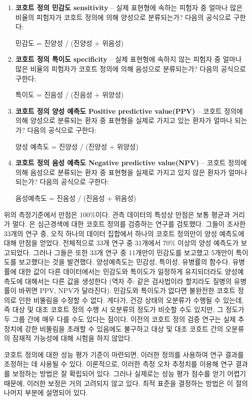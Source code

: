 \documentclass[10.5pt]{book}
\theoremstyle{definition}
\theoremstyle{definition}
\theoremstyle{definition}
\theoremstyle{remark}
\begin{document}
\begin{enumerate}
\def\labelenumi{\arabic{enumi}.}
\item
  \textbf{코호트 정의 민감도 sensitivity} -- 실제 표현형에 속하는 피험자
  중 얼마나 많은 비율의 피험자가 코호트 정의에 의해 양성으로 분류되는가?
  다음의 공식으로 구한다:

  민감도 = 진양성 / (진양성 + 위음성)
\item
  \textbf{코호트 정의 특이도 specificity} -- 실제 표현형에 속하지 않는
  피험자 중 얼마나 많은 비율의 피험자가 코호트 정의에 의해 음성으로
  분류되는가? 다음의 공식으로 구한다:

  특이도 = 진음성 / (진음성 + 위양성)
\item
  \textbf{코호트 정의 양성 예측도 Positive predictive value(PPV)} --
  코호트 정의에 의해 양성으로 분류되는 환자 중 표현형을 실제로 가지고
  있는 환자가 얼마나 되는가? 다음의 공식으로 구한다:

  양성 예측도 = 진양성 / (진양성 + 위양성)
\item
  \textbf{코호트 정의 음성 예측도 Negative predictive value(NPV)} --
  코호트 정의에 의해 음성으로 분류되는 환자 중 표현형을 실제로 가지고
  있지 않은 환자가 얼마나 되는가? 다음의 공식으로 구한다:

  음성예측도 = 진음성 / (진음성 + 위음성)
\end{enumerate}

위의 측정기준에서 만점은 100\%이다. 관측 데이터의 특성상 만점은 보통
평균과 거리가 멀다. \citet{Rubbo2015phenotypes} 은 심근경색에 대한
코호트 정의를 검증하는 연구를 검토했다. 그들이 조사한 33개의 연구 중,
오직 하나의 데이터 집합에서 하나의 코호트 정의만이 양성 예측도에 대해
만점을 얻었다. 전체적으로 33개 연구 중 31개에서 70\% 이상의 양성
예측도가 보고되었다. 그러나 그들은 또한 33개 연구 중 11개만이 민감도를
보고했고 5개만이 특이도를 보고했다는 것을 발견했다. 양성예측도는 민감성,
특이성, 유병률의 함수다. 유병률에 대한 값이 다른 데이터에서는 민감도와
특이도가 일정하게 유지되더라도 양성예측도에 대해서는 다른 값을 생성한다
(역자 주: 같은 검사법이라 할지라도 질병의 유병률이 바뀌면 PPV, NPV가
달라진다). 민감도와 특이도가 없다면 불완전한 코호트 정의로 인한 비뚤림을
수정할 수 없다. 게다가, 건강 상태의 오분류가 수행될 수 있는데, 즉 대상
및 대조 코호트 정의 수행 시 오분류의 정도가 비슷할 수도 있지만, 그
정도가 두 그룹 간에 매우 다를 수도 있다는 점이다. 이전의 코호트 정의
검증 연구는 실제 추정치에 강한 비뚤림을 초래할 수 있음에도 불구하고 대상
및 대조 코호트 간의 오분류의 잠재적 가능성에 대해 시험을 하지 않았다.

코호트 정의에 대한 성능 평가 기준이 마련되면, 이러한 정의를 사용하여
연구 결과를 조정하는 데 사용될 수 있다. 이론적으로, 이러한 측정 오차
추정치를 이용해 연구 결과를 보정하는 방법은 잘 확립되어 있다. 그러나
실제로는 성능 평가 점수를 얻기 어렵기 때문에, 이러한 보정은 거의
고려되지 않고 있다. 최적 표준을 결정하는 방법은 이 절의 나머지 부분에
설명되어 있다.
\end{document}
